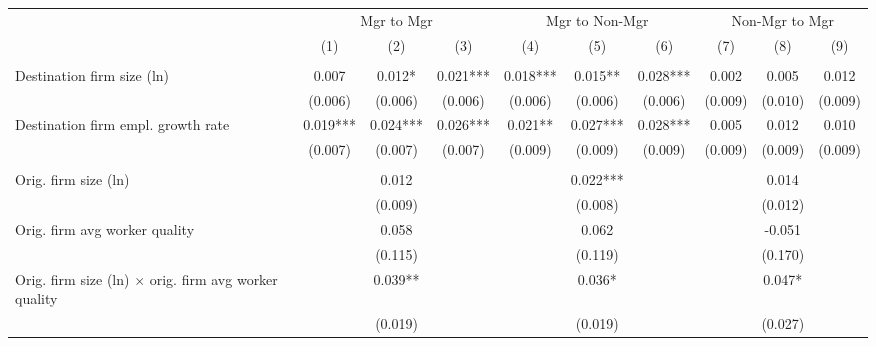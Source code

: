 {
\def\sym#1{\ifmmode^{#1}\else\(^{#1}\)\fi}
\begin{tabular}{l*{9}{c}}
                &\multicolumn{3}{c}{Mgr to Mgr}        &\multicolumn{3}{c}{Mgr to Non-Mgr}    &\multicolumn{3}{c}{Non-Mgr to Mgr}    \\\cmidrule(lr){2-4}\cmidrule(lr){5-7}\cmidrule(lr){8-10}
                &\multicolumn{1}{c}{(1)}   &\multicolumn{1}{c}{(2)}   &\multicolumn{1}{c}{(3)}   &\multicolumn{1}{c}{(4)}   &\multicolumn{1}{c}{(5)}   &\multicolumn{1}{c}{(6)}   &\multicolumn{1}{c}{(7)}   &\multicolumn{1}{c}{(8)}   &\multicolumn{1}{c}{(9)}   \\
\midrule        &            &            &            &            &            &            &            &            &            \\
Destination firm size (ln)&    0.007   &    0.012*  &    0.021***&    0.018***&    0.015** &    0.028***&    0.002   &    0.005   &    0.012   \\
                &  (0.006)   &  (0.006)   &  (0.006)   &  (0.006)   &  (0.006)   &  (0.006)   &  (0.009)   &  (0.010)   &  (0.009)   \\
Destination firm empl. growth rate&    0.019***&    0.024***&    0.026***&    0.021** &    0.027***&    0.028***&    0.005   &    0.012   &    0.010   \\
                &  (0.007)   &  (0.007)   &  (0.007)   &  (0.009)   &  (0.009)   &  (0.009)   &  (0.009)   &  (0.009)   &  (0.009)   \\
\\ Orig. firm size (ln)&            &    0.012   &            &            &    0.022***&            &            &    0.014   &            \\
                &            &  (0.009)   &            &            &  (0.008)   &            &            &  (0.012)   &            \\
Orig. firm avg worker quality&            &    0.058   &            &            &    0.062   &            &            &   -0.051   &            \\
                &            &  (0.115)   &            &            &  (0.119)   &            &            &  (0.170)   &            \\
Orig. firm size (ln) $\times$ orig. firm avg worker quality&            &    0.039** &            &            &    0.036*  &            &            &    0.047*  &            \\
                &            &  (0.019)   &            &            &  (0.019)   &            &            &  (0.027)   &            \\

\end{tabular}}
